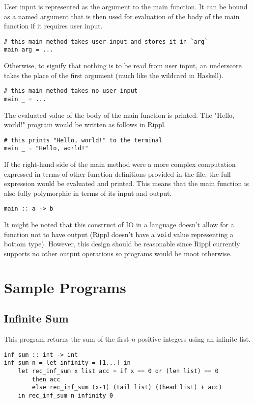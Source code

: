 \documentclass[5pt]{article}
\begin{document}
User input is represented as the argument to the main function. It can be bound as a named argument that is then used for evaluation of the body of the main function if it requires user input. \\

\begin{lstlisting}[language=rippl]
# this main method takes user input and stores it in `arg`
main arg = ... 
\end{lstlisting}

Otherwise, to signify that nothing is to be read from user input, an underscore takes the place of the first argument (much like the wildcard in Haskell). \\

\begin{lstlisting}[language=rippl]
# this main method takes no user input
main _ = ...    
\end{lstlisting}

The evaluated value of the body of the main function is printed. The "Hello, world!" program would be written as follows in Rippl.

\begin{lstlisting}[language=rippl]
# this prints "Hello, world!" to the terminal
main _ = "Hello, world!"
\end{lstlisting}

If the right-hand side of the main method were a more complex computation expressed in terms of other function definitions provided in the file, the full expression would be evaluated and printed. This means that the main function is also fully polymorphic in terms of its input and output. \\

\begin{lstlisting}[language=rippl]
main :: a -> b
\end{lstlisting}

It might be noted that this construct of IO in a language doesn't allow for a function not to have output (Rippl doesn't have a \texttt{void} value representing a bottom type). However, this design should be reasonable since Rippl currently supports no other output operations so programs would be moot otherwise. \\
\section{Sample Programs}
\subsection{Infinite Sum}
This program returns the sum of the first $n$ positive integers using an 
infinite list.
\begin{lstlisting}[language=rippl]
inf_sum :: int -> int
inf_sum n = let infinity = [1...] in
    let rec_inf_sum x list acc = if x == 0 or (len list) == 0
        then acc
        else rec_inf_sum (x-1) (tail list) ((head list) + acc)
    in rec_inf_sum n infinity 0
\end{lstlisting}
\end{document}
